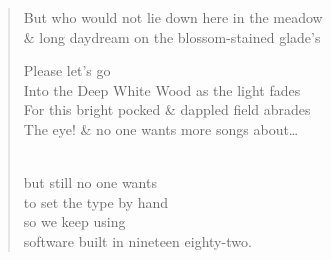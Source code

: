 \documentclass{article}
\begin{document}
\begin{verse}
     But who would not lie down here in the meadow \\
    \& long daydream on the blossom-stained glade’s \\

     \antilabe{} Please let’s go \\
    Into the Deep White Wood as the light fades \\
    For this bright pocked \& dappled field abrades \\
    The eye! \& no one wants more songs about\dots{}

     \\
    \antilabe{} but still no one wants \\
    to set the type by hand \\

     so we keep using \\
    software built in nineteen eighty-two.
\end{verse}
\end{document}
